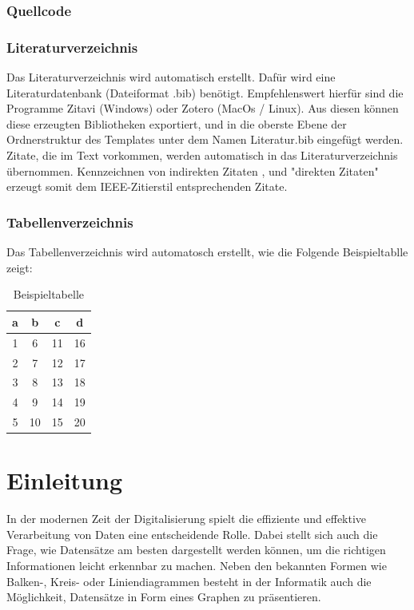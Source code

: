 \subsection{Quellcode}\label{Quellcode}
{

}

\subsection{Literaturverzeichnis}\label{Literaturverzeichnis}
Das Literaturverzeichnis wird automatisch erstellt. Dafür wird eine Literaturdatenbank (Dateiformat .bib) benötigt. Empfehlenswert hierfür sind die Programme Zitavi (Windows) oder Zotero (MacOs / Linux). Aus diesen können diese erzeugten Bibliotheken exportiert, und in die oberste Ebene der Ordnerstruktur des Templates unter dem Namen Literatur.bib eingefügt werden. Zitate, die im Text vorkommen, werden automatisch in das Literaturverzeichnis übernommen.
Kennzeichnen von indirekten Zitaten \cite{noauthor_software_nodate}, und "direkten Zitaten" \cite[s.~234]{noauthor_software_nodate} erzeugt somit dem IEEE-Zitierstil entsprechenden Zitate.
\newpage

\subsection{Tabellenverzeichnis}\label{Tabellenverzeichnis}
Das Tabellenverzeichnis wird automatosch erstellt, wie die Folgende Beispieltablle zeigt:

\begin{table}[h!]
\centering
 \begin{tabular}{||c c c c||} 
 \hline
 a & b & c & d \\ [0.5ex] 
 \hline\hline
 1 & 6 & 11 & 16 \\ 
 2 & 7 & 12 & 17 \\
 3 & 8 & 13 & 18 \\
 4 & 9 & 14 & 19 \\
 5 & 10 & 15 & 20 \\ [1ex] 
 \hline
 \end{tabular}
 \caption{Beispieltabelle}
\end{table}

\chapter{Einleitung}
In der modernen Zeit der Digitalisierung spielt die effiziente und effektive Verarbeitung von Daten eine entscheidende Rolle. Dabei stellt sich auch die Frage, wie Datensätze am besten dargestellt werden können, um die richtigen Informationen leicht erkennbar zu machen. Neben den bekannten Formen wie Balken-, Kreis- oder Liniendiagrammen besteht in der Informatik auch die Möglichkeit, Datensätze in Form eines Graphen zu präsentieren.


